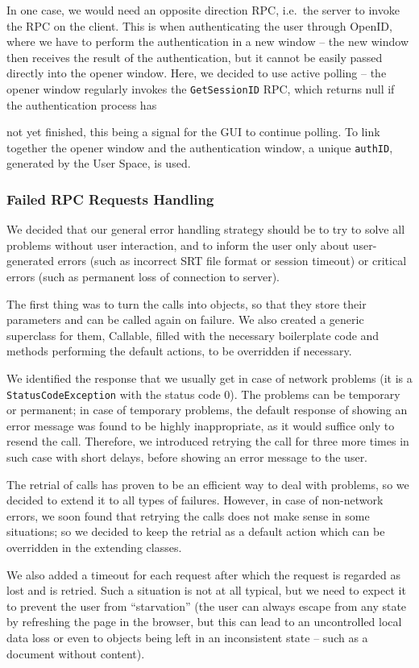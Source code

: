 In one case, we would need an opposite direction RPC, i.e.\ the server to invoke the RPC on the client. This is when authenticating the user through OpenID, where we have to perform the authentication in a new window -- the new window then receives the result of the authentication, but it cannot be easily passed directly into the opener window. Here, we decided to use active polling -- the opener window regularly invokes the {\tt GetSessionID} RPC, which returns null if the authentication process has{ not yet finished, this being a signal for the GUI to continue polling. To link together the opener window and the authentication window, a unique {\tt authID}, generated by the User Space, is used.

\subsubsection{Failed RPC Requests Handling}

We decided that our general error handling strategy should be to try to solve all problems without user interaction, and to inform the user only about user-generated errors (such as incorrect SRT file format or session timeout) or critical errors (such as permanent loss of connection to server).

The first thing was to turn the calls into objects, so that they store their parameters and can be called again on failure. We also created a generic superclass for them, Callable, filled with the necessary boilerplate code and methods performing the default actions, to be overridden if necessary.

We identified the response that we usually get in case of network problems (it is a {\tt StatusCodeException} with the status code 0). The problems can be temporary or permanent; in case of temporary problems, the default response of showing an error message was found to be highly inappropriate, as it would suffice only to resend the call. Therefore, we introduced retrying the call for three more times in such case with short delays, before showing an error message to the user.

The retrial of calls has proven to be an efficient way to deal with problems, so we decided to extend it to all types of failures. However, in case of non-network errors, we soon found that retrying the calls does not make sense in some situations; so we decided to keep the retrial as a default action which can be overridden in the extending classes.

We also added a timeout for each request after which the request is regarded as lost and is retried. Such a situation is not at all typical, but we need to expect  it to prevent the user from ``starvation'' (the user can always escape from any state by refreshing the page in the browser, but this can lead to an uncontrolled local data loss or even to objects being left in an inconsistent state -- such as a document without content).

}
